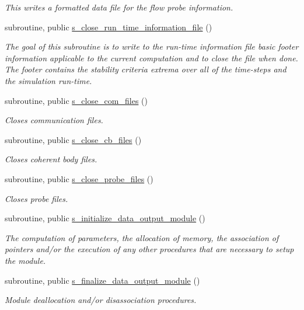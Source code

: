 \begin{DoxyCompactItemize}
\begin{DoxyCompactList}\small\item\em This writes a formatted data file for the flow probe information. \end{DoxyCompactList}\item 
subroutine, public \hyperlink{namespacem__data__output_a390239a7390ec5d07e31298573bf09bf}{s\+\_\+close\+\_\+run\+\_\+time\+\_\+information\+\_\+file} ()
\begin{DoxyCompactList}\small\item\em The goal of this subroutine is to write to the run-\/time information file basic footer information applicable to the current computation and to close the file when done. The footer contains the stability criteria extrema over all of the time-\/steps and the simulation run-\/time. \end{DoxyCompactList}\item 
subroutine, public \hyperlink{namespacem__data__output_a5646b1076ff72b2260ebefa3f44d4754}{s\+\_\+close\+\_\+com\+\_\+files} ()
\begin{DoxyCompactList}\small\item\em Closes communication files. \end{DoxyCompactList}\item 
subroutine, public \hyperlink{namespacem__data__output_aa0eb8be31f69888d750e18df197c6011}{s\+\_\+close\+\_\+cb\+\_\+files} ()
\begin{DoxyCompactList}\small\item\em Closes coherent body files. \end{DoxyCompactList}\item 
subroutine, public \hyperlink{namespacem__data__output_a4036cc239adda35d59422a3e61bb657e}{s\+\_\+close\+\_\+probe\+\_\+files} ()
\begin{DoxyCompactList}\small\item\em Closes probe files. \end{DoxyCompactList}\item 
subroutine, public \hyperlink{namespacem__data__output_ab65b312ef83adb104cafafada9c998b6}{s\+\_\+initialize\+\_\+data\+\_\+output\+\_\+module} ()
\begin{DoxyCompactList}\small\item\em The computation of parameters, the allocation of memory, the association of pointers and/or the execution of any other procedures that are necessary to setup the module. \end{DoxyCompactList}\item 
subroutine, public \hyperlink{namespacem__data__output_a02f2b04a434c1f0ebf9156147d0f976e}{s\+\_\+finalize\+\_\+data\+\_\+output\+\_\+module} ()
\begin{DoxyCompactList}\small\item\em Module deallocation and/or disassociation procedures. \end{DoxyCompactList}\end{DoxyCompactItemize}
